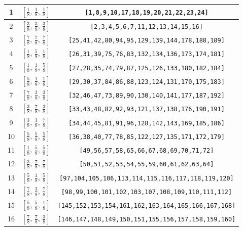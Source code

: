 \documentclass[fleqn,8pt]{jsarticle}
\begin{document}
\begin{longtable}{ccc}
1 & $\left[ \frac{1}{8},\, \frac{1}{8},\, \frac{1}{8} \right]$ & {\tt [1,8,9,10,17,18,19,20,21,22,23,24]} \\ \hline
2 & $\left[ \frac{3}{8},\, \frac{3}{8},\, \frac{3}{8} \right]$ & {\tt [2,3,4,5,6,7,11,12,13,14,15,16]} \\ \hline
3 & $\left[ \frac{7}{8},\, \frac{7}{8},\, \frac{7}{8} \right]$ & {\tt [25,41,42,80,94,95,129,139,144,178,188,189]} \\ \hline
4 & $\left[ \frac{1}{8},\, \frac{5}{8},\, \frac{1}{8} \right]$ & {\tt [26,31,39,75,76,83,132,134,136,173,174,181]} \\ \hline
5 & $\left[ \frac{1}{8},\, \frac{1}{8},\, \frac{5}{8} \right]$ & {\tt [27,28,35,74,79,87,125,126,133,180,182,184]} \\ \hline
6 & $\left[ \frac{5}{8},\, \frac{1}{8},\, \frac{1}{8} \right]$ & {\tt [29,30,37,84,86,88,123,124,131,170,175,183]} \\ \hline
7 & $\left[ \frac{7}{8},\, \frac{3}{8},\, \frac{3}{8} \right]$ & {\tt [32,46,47,73,89,90,130,140,141,177,187,192]} \\ \hline
8 & $\left[ \frac{3}{8},\, \frac{7}{8},\, \frac{3}{8} \right]$ & {\tt [33,43,48,82,92,93,121,137,138,176,190,191]} \\ \hline
9 & $\left[ \frac{3}{8},\, \frac{3}{8},\, \frac{7}{8} \right]$ & {\tt [34,44,45,81,91,96,128,142,143,169,185,186]} \\ \hline
10 & $\left[ \frac{5}{8},\, \frac{5}{8},\, \frac{5}{8} \right]$ & {\tt [36,38,40,77,78,85,122,127,135,171,172,179]} \\ \hline
11 & $\left[ \frac{1}{8},\, \frac{5}{8},\, \frac{5}{8} \right]$ & {\tt [49,56,57,58,65,66,67,68,69,70,71,72]} \\ \hline
12 & $\left[ \frac{3}{8},\, \frac{7}{8},\, \frac{7}{8} \right]$ & {\tt [50,51,52,53,54,55,59,60,61,62,63,64]} \\ \hline
13 & $\left[ \frac{5}{8},\, \frac{1}{8},\, \frac{5}{8} \right]$ & {\tt [97,104,105,106,113,114,115,116,117,118,119,120]} \\ \hline
14 & $\left[ \frac{7}{8},\, \frac{3}{8},\, \frac{7}{8} \right]$ & {\tt [98,99,100,101,102,103,107,108,109,110,111,112]} \\ \hline
15 & $\left[ \frac{5}{8},\, \frac{5}{8},\, \frac{1}{8} \right]$ & {\tt [145,152,153,154,161,162,163,164,165,166,167,168]} \\ \hline
16 & $\left[ \frac{7}{8},\, \frac{7}{8},\, \frac{3}{8} \right]$ & {\tt [146,147,148,149,150,151,155,156,157,158,159,160]} \\
\end{longtable}
\end{document}
